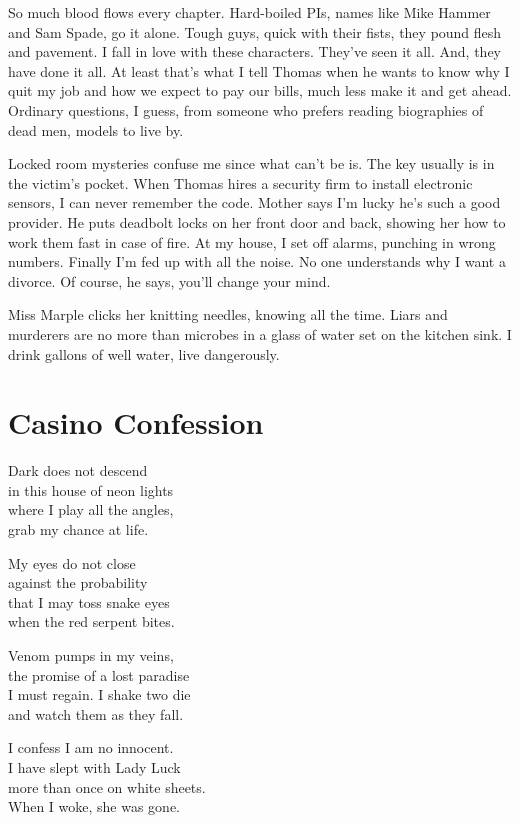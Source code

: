\documentclass[twoside,10pt]{book}
\begin{document}
So much blood flows every chapter. Hard-boiled PIs, names like Mike
Hammer and Sam Spade, go it alone. Tough guys, quick with their fists,
they pound flesh and pavement. I fall in love with these characters.
They've seen it all. And, they have done it all. At least that's what I
tell Thomas when he wants to know why I quit my job and how we expect to
pay our bills, much less make it and get ahead. Ordinary questions, I
guess, from someone who prefers reading biographies of dead men, models
to live by.

Locked room mysteries confuse me since what can't be is. The key usually
is in the victim's pocket. When Thomas hires a security firm to install
electronic sensors, I can never remember the code. Mother says I'm lucky
he's such a good provider. He puts deadbolt locks on her front door and
back, showing her how to work them fast in case of fire. At my house, I
set off alarms, punching in wrong numbers. Finally I'm fed up with all
the noise. No one understands why I want a divorce. Of course, he says,
you'll change your mind.

Miss Marple clicks her knitting needles, knowing all the time. Liars and
murderers are no more than microbes in a glass of water set on the
kitchen sink. I drink gallons of well water, live dangerously.


\clearpage
\section{Casino Confession}

Dark does not descend\\
in this house of neon lights\\
where I play all the angles,\\
grab my chance at life.

My eyes do not close\\
against the probability\\
that I may toss snake eyes\\
when the red serpent bites.

Venom pumps in my veins,\\
the promise of a lost paradise\\
I must regain. I shake two die\\
and watch them as they fall.

I confess I am no innocent.\\
I have slept with Lady Luck\\
more than once on white sheets.\\
When I woke, she was gone.
\end{document}
